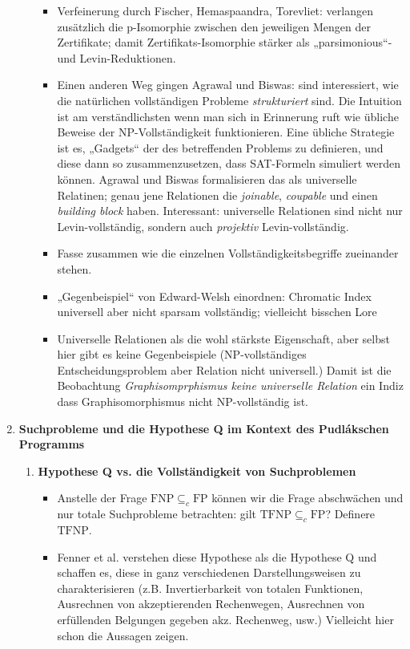 \documentclass[nofonts]{uebung}
\begin{document}
\begin{enumerate}[label*=\arabic*.]
\begin{enumerate}[label*=\arabic*.]
\begin{itemize}
                    \item Verfeinerung durch Fischer, Hemaspaandra, Torevliet: verlangen zusätzlich die p-Isomorphie zwischen den jeweiligen Mengen der Zertifikate; damit Zertifikats-Isomorphie stärker als „parsimonious“- und Levin-Reduktionen.
                    \item Einen anderen Weg gingen Agrawal und Biswas: sind interessiert, wie die natürlichen vollständigen Probleme \emph{strukturiert} sind. Die Intuition ist am verständlichsten wenn man sich in Erinnerung ruft wie übliche Beweise der NP-Vollständigkeit funktionieren. Eine übliche Strategie ist es, „Gadgets“ der des betreffenden Problems zu definieren, und diese dann so zusammenzusetzen, dass  SAT-Formeln simuliert werden können. Agrawal und Biswas formalisieren das als universelle Relatinen; genau jene Relationen die \emph{joinable}, \emph{coupable} und einen \emph{building block} haben. Interessant: universelle Relationen sind nicht nur Levin-vollständig, sondern auch \emph{projektiv} Levin-vollständig.  
                    \item Fasse zusammen wie die einzelnen Vollständigkeitsbegriffe zueinander stehen.
                    \item „Gegenbeispiel“ von Edward-Welsh einordnen: Chromatic Index universell aber nicht sparsam vollständig; vielleicht bisschen Lore
                    \item Universelle Relationen als die wohl stärkste Eigenschaft, aber selbst hier gibt es keine Gegenbeispiele (NP-vollständiges Entscheidungsproblem aber Relation nicht universell.) Damit ist die Beobachtung \emph{Graphisomprphismus keine universelle Relation} ein Indiz dass Graphisomorphismus nicht NP-vollständig ist.
                \end{itemize}
        \end{enumerate}
    \item \textbf{Suchprobleme und die Hypothese Q im Kontext des Pudlákschen Programms}
        \begin{enumerate}[label*=\arabic*.]
            \item \textbf{Hypothese Q vs. die Vollständigkeit von Suchproblemen}
            \begin{itemize}
                \item Anstelle der Frage $\mathrm{FNP}\subseteq_c \mathrm{FP}$ können wir die Frage abschwächen und nur totale Suchprobleme betrachten: gilt $\mathrm{TFNP}\subseteq_c \mathrm{FP}$? Definere $\mathrm{TFNP}$.
                \item Fenner et al. verstehen diese Hypothese als die Hypothese Q und schaffen es, diese in ganz verschiedenen Darstellungsweisen zu charakterisieren (z.B. Invertierbarkeit von totalen Funktionen, Ausrechnen von akzeptierenden Rechenwegen, Ausrechnen von erfüllenden Belgungen gegeben akz. Rechenweg, usw.) Vielleicht hier schon die Aussagen zeigen.

\end{itemize}
\end{enumerate}
\end{enumerate}
\end{document}
